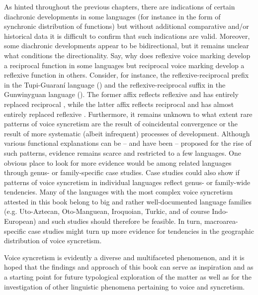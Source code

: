 As hinted throughout the previous chapters, there are indications of certain diachronic developments in some languages (for instance in the form of synchronic distribution of functions) but without additional comparative and/or historical data it is difficult to confirm that such indications are valid. Moreover, some diachronic developments appear to be bidirectional, but it remains unclear what conditions the directionality. Say, why does reflexive voice marking develop a reciprocal function in some languages but reciprocal voice marking develop a reflexive function in others. Consider, for instance, the reflexive-reciprocal prefix  in the Tupi-Guaraní language  () and the reflexive-reciprocal suffix  in the Gunwinyguan language  (). The former affix reflects  reflexive  and has entirely replaced reciprocal  \citep{jensen:1998}, while the latter affix reflects  reciprocal  and has almost entirely replaced reflexive  \citep{alpher:al:2003}. Furthermore, it remains unknown to what extent rare patterns of voice syncretism are the result of coincidental convergence or the result of more systematic (albeit infrequent) processes of development. Although various functional explanations can be -- and have been -- proposed for the rise of such patterns, evidence remains scarce and restricted to a few languages. One obvious place to look for more evidence would be among related languages through genus- or family-specific case studies. Case studies could also show if patterns of voice syncretism in individual languages reflect genus- or family-wide tendencies. Many of the languages with the most complex voice syncretism attested in this book belong to big and rather well-documented language families (e.g. Uto-Aztecan, Oto-Manguean, Iroquoian, Turkic, and of course Indo-European) and such studies should therefore be feasible. In turn, macroarea-specific case studies might turn up more evidence for tendencies in the geographic distribution of voice syncretism.

Voice syncretism is evidently a diverse and multifaceted phenomenon, and it is hoped that the findings and approach of this book can serve as inspiration and as a starting point for future typological exploration of the matter as well as for the investigation of other linguistic phenomena pertaining to voice and syncretism.
